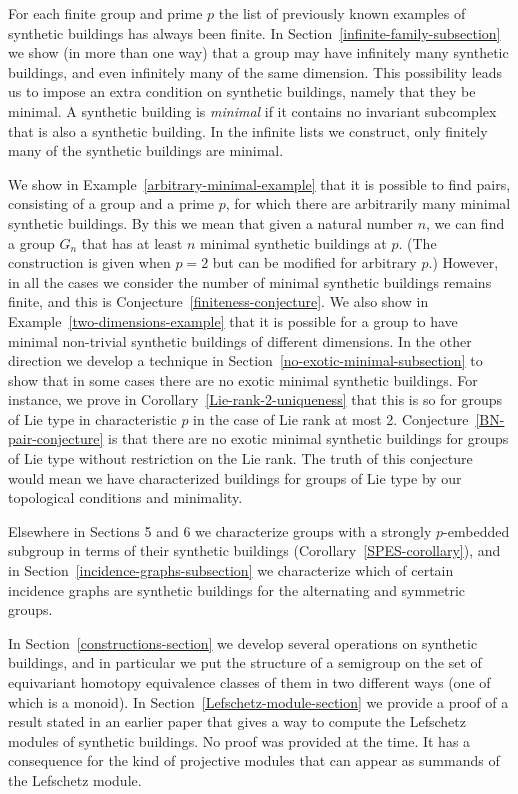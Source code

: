 \documentclass[12pt]{amsart}
\theoremstyle{plain}
\theoremstyle{definition}
\theoremstyle{remark}
\numberwithin{equation}{section}
\begin{document}
For each finite group and prime $p$ the list of previously known examples of synthetic buildings has always been finite. In Section~\ref{infinite-family-subsection} we show (in more than one way) that a group may have infinitely many synthetic buildings, and even infinitely many of the same dimension. This possibility leads us to impose an extra condition on synthetic buildings, namely that they be minimal. A synthetic building is \textit{minimal} if it contains no invariant subcomplex that is also a synthetic building. In the infinite lists we construct, only finitely many of the synthetic buildings are minimal.

We show in Example~\ref{arbitrary-minimal-example} that it is possible to find pairs, consisting of a group and a prime $p$, for which there are arbitrarily many minimal synthetic buildings. By this we mean that given a natural number $n$, we can find a group $G_n$ that has at least $n$ minimal synthetic buildings at $p$. (The construction is given when $p=2$ but can be modified for arbitrary $p$.) However, in all the cases we consider the number of minimal synthetic buildings remains finite, and this is Conjecture~\ref{finiteness-conjecture}. We also show in Example~\ref{two-dimensions-example} that it is possible for a group to have minimal non-trivial synthetic buildings of different dimensions. In the other direction we develop a technique in Section~\ref{no-exotic-minimal-subsection} to show that in some cases there are no exotic minimal synthetic buildings. For instance, we prove in Corollary~\ref{Lie-rank-2-uniqueness} that this is so for groups of Lie type in characteristic $p$ in the case of Lie rank at most 2. Conjecture~\ref{BN-pair-conjecture} is that there are no exotic minimal synthetic buildings for groups of Lie type without restriction on the Lie rank. The truth of this conjecture would mean we have characterized buildings for groups of Lie type by our topological conditions and minimality.

Elsewhere in Sections 5 and 6 we characterize groups with a strongly $p$-embedded subgroup in terms of their synthetic buildings (Corollary~\ref{SPES-corollary}), and in Section~\ref{incidence-graphs-subsection} we characterize which of certain incidence graphs are synthetic buildings for the alternating and symmetric groups.

In Section~\ref{constructions-section} we develop several operations on synthetic buildings, and in particular we put the structure of a semigroup on the set of equivariant homotopy equivalence classes of them in two different ways (one of which is a monoid). In Section~\ref{Lefschetz-module-section} we provide a proof of a result stated in an earlier paper that gives a way to compute the Lefschetz modules of synthetic buildings. No proof was provided at the time. It has a consequence for the kind of projective modules that can appear as summands of the Lefschetz module.
\end{document}
